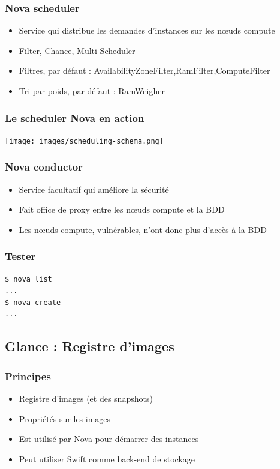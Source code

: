   \begin{frame}
    \frametitle{Nova scheduler}
    \begin{itemize}
      \item Service qui distribue les demandes d'instances sur les nœuds compute
      \item Filter, Chance, Multi Scheduler
      \item Filtres, par défaut : AvailabilityZoneFilter,RamFilter,ComputeFilter
      \item Tri par poids, par défaut : RamWeigher
    \end{itemize}
  \end{frame}

  \begin{frame}
    \frametitle{Le scheduler Nova en action}
    \texttt{[image: images/scheduling-schema.png]}
  \end{frame}

  \begin{frame}
    \frametitle{Nova conductor}
    \begin{itemize}
      \item Service facultatif qui améliore la sécurité
      \item Fait office de proxy entre les nœuds compute et la BDD
      \item Les nœuds compute, vulnérables, n'ont donc plus d'accès à la BDD
    \end{itemize}
  \end{frame}

  \begin{frame}[containsverbatim]
    \frametitle{Tester}
\begin{verbatim}
$ nova list
...
$ nova create
...
\end{verbatim}
  \end{frame}

  \subsection[Glance]{Glance : Registre d'images}

  \begin{frame}
    \frametitle{Principes}
    \begin{itemize}
      \item Registre d'images (et des snapshots)
      \item Propriétés sur les images
      \item Est utilisé par Nova pour démarrer des instances
      \item Peut utiliser Swift comme back-end de stockage
    \end{itemize}
  \end{frame}

